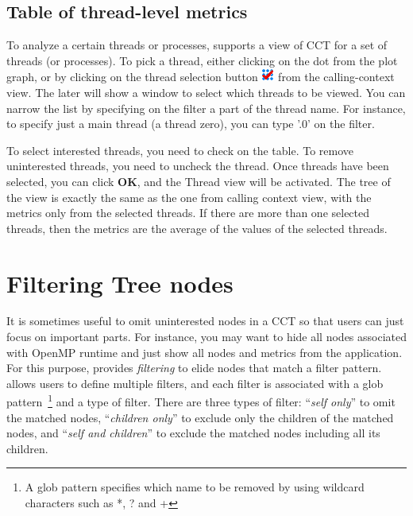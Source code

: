 \subsection{Table of thread-level metrics}
\label{sec:thread-level-table}

To analyze a certain threads or processes, \hpcviewer{} supports a view of CCT for a set of threads (or processes).
To pick a thread, either clicking on the dot from the plot graph, or by clicking on the thread selection button \includegraphics[scale=.6]{fig/hpcviewer-thread.png} from the calling-context view.
The later will show a window to select which threads to be viewed. You can narrow the list by specifying on the filter a part of the thread name.
For instance, to specify just a main thread (a thread zero), you can type '.0' on the filter.

To select interested threads, you need to check on the table. To remove uninterested threads, you need to uncheck the thread.
Once threads have been selected, you can click \textbf{OK}, and the Thread view will be activated. 
The tree of the view is exactly the same as the one from calling context view, with the metrics only from the selected threads.
If there are more than one selected threads, then the metrics are the average of the values of the selected threads.


\section{Filtering Tree nodes}
\label{sec:filter}
It is sometimes useful to omit uninterested nodes in a CCT so that users can just focus on important parts. 
For instance, you may want to hide all nodes associated with OpenMP runtime and just show all nodes and metrics from the application. 
For this purpose, \hpcviewer{} provides \emph{filtering} to elide nodes that match a filter pattern.
\hpcviewer{} allows  users to define multiple filters, and each filter is associated with a glob pattern~\footnote{A glob pattern specifies which name to be removed by using wildcard characters such as *, ? and +} and a type of filter.
There are three types of filter: ``\emph{self only}'' to omit the matched nodes, 
``\emph{children only}'' to exclude only the children of the matched nodes, and ``\emph{self and children}'' to
exclude the matched nodes including all its children.

